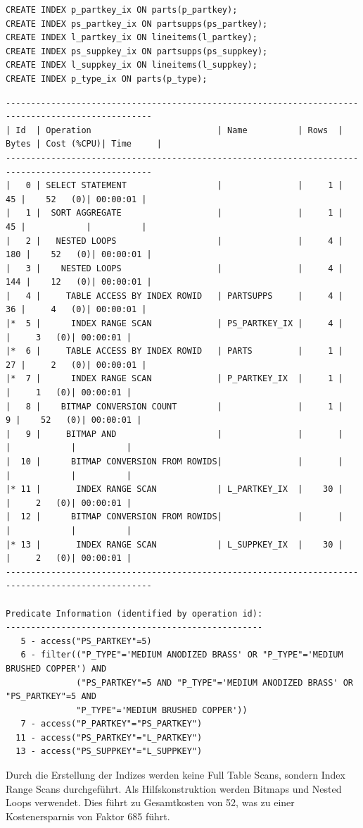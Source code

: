 \documentclass[10pt]{article}
\begin{document}
\begin{lstlisting}[style=sql]
CREATE INDEX p_partkey_ix ON parts(p_partkey);
CREATE INDEX ps_partkey_ix ON partsupps(ps_partkey);
CREATE INDEX l_partkey_ix ON lineitems(l_partkey);
CREATE INDEX ps_suppkey_ix ON partsupps(ps_suppkey);
CREATE INDEX l_suppkey_ix ON lineitems(l_suppkey);
CREATE INDEX p_type_ix ON parts(p_type);
\end{lstlisting}
\begin{lstlisting}[style=queryexecutionplanSmall]
---------------------------------------------------------------------------------------------------
| Id  | Operation                         | Name          | Rows  | Bytes | Cost (%CPU)| Time     |
---------------------------------------------------------------------------------------------------
|   0 | SELECT STATEMENT                  |               |     1 |    45 |    52   (0)| 00:00:01 |
|   1 |  SORT AGGREGATE                   |               |     1 |    45 |            |          |
|   2 |   NESTED LOOPS                    |               |     4 |   180 |    52   (0)| 00:00:01 |
|   3 |    NESTED LOOPS                   |               |     4 |   144 |    12   (0)| 00:00:01 |
|   4 |     TABLE ACCESS BY INDEX ROWID   | PARTSUPPS     |     4 |    36 |     4   (0)| 00:00:01 |
|*  5 |      INDEX RANGE SCAN             | PS_PARTKEY_IX |     4 |       |     3   (0)| 00:00:01 |
|*  6 |     TABLE ACCESS BY INDEX ROWID   | PARTS         |     1 |    27 |     2   (0)| 00:00:01 |
|*  7 |      INDEX RANGE SCAN             | P_PARTKEY_IX  |     1 |       |     1   (0)| 00:00:01 |
|   8 |    BITMAP CONVERSION COUNT        |               |     1 |     9 |    52   (0)| 00:00:01 |
|   9 |     BITMAP AND                    |               |       |       |            |          |
|  10 |      BITMAP CONVERSION FROM ROWIDS|               |       |       |            |          |
|* 11 |       INDEX RANGE SCAN            | L_PARTKEY_IX  |    30 |       |     2   (0)| 00:00:01 |
|  12 |      BITMAP CONVERSION FROM ROWIDS|               |       |       |            |          |
|* 13 |       INDEX RANGE SCAN            | L_SUPPKEY_IX  |    30 |       |     2   (0)| 00:00:01 |
---------------------------------------------------------------------------------------------------
 
Predicate Information (identified by operation id):
---------------------------------------------------
   5 - access("PS_PARTKEY"=5)
   6 - filter(("P_TYPE"='MEDIUM ANODIZED BRASS' OR "P_TYPE"='MEDIUM BRUSHED COPPER') AND 
              ("PS_PARTKEY"=5 AND "P_TYPE"='MEDIUM ANODIZED BRASS' OR "PS_PARTKEY"=5 AND 
              "P_TYPE"='MEDIUM BRUSHED COPPER'))
   7 - access("P_PARTKEY"="PS_PARTKEY")
  11 - access("PS_PARTKEY"="L_PARTKEY")
  13 - access("PS_SUPPKEY"="L_SUPPKEY")
\end{lstlisting}
Durch die Erstellung der Indizes werden keine Full Table Scans, sondern Index Range Scans 
durchgeführt. Als Hilfskonstruktion werden Bitmaps und Nested Loops verwendet. Dies führt zu
Gesamtkosten von 52, was zu einer Kostenersparnis von Faktor 685 führt.
\end{document}
